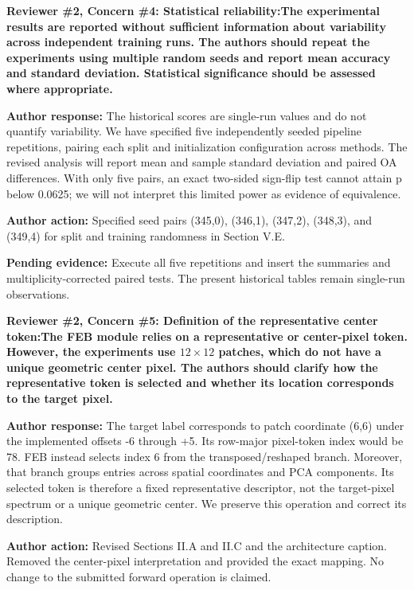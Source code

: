 \documentclass[a4paper,onecolumn,11pt]{IEEEtran}
\newcommand{\pending}[1]{\par\noindent\textcolor{red!70!black}{\textbf{Pending evidence:} #1}\par}
\begin{document}
\vspace{1.5em}
{\color{reviewgreen}\textbf{Reviewer \#2, Concern \#4: Statistical reliability:The experimental results are reported without sufficient information about variability across independent training runs. The authors should repeat the experiments using multiple random seeds and report mean accuracy and standard deviation. Statistical significance should be assessed where appropriate. }}

\textbf{Author response:}
The historical scores are single-run values and do not quantify variability. We have specified five independently seeded pipeline repetitions, pairing each split and initialization configuration across methods. The revised analysis will report mean and sample standard deviation and paired OA differences. With only five pairs, an exact two-sided sign-flip test cannot attain p below 0.0625; we will not interpret this limited power as evidence of equivalence.

\textbf{Author action:}
Specified seed pairs (345,0), (346,1), (347,2), (348,3), and (349,4) for split and training randomness in Section V.E. \pending{Execute all five repetitions and insert the summaries and multiplicity-corrected paired tests. The present historical tables remain single-run observations.}

\vspace{1.5em}
{\color{reviewgreen}\textbf{Reviewer \#2, Concern \#5: Definition of the representative center token:The FEB module relies on a representative or center-pixel token. However, the experiments use $12\times12$ patches, which do not have a unique geometric center pixel. The authors should clarify how the representative token is selected and whether its location corresponds to the target pixel. }}

\textbf{Author response:}
The target label corresponds to patch coordinate (6,6) under the implemented offsets -6 through +5. Its row-major pixel-token index would be 78. FEB instead selects index 6 from the transposed/reshaped branch. Moreover, that branch groups entries across spatial coordinates and PCA components. Its selected token is therefore a fixed representative descriptor, not the target-pixel spectrum or a unique geometric center. We preserve this operation and correct its description.

\textbf{Author action:}
Revised Sections II.A and II.C and the architecture caption. Removed the center-pixel interpretation and provided the exact mapping. No change to the submitted forward operation is claimed.
\end{document}
